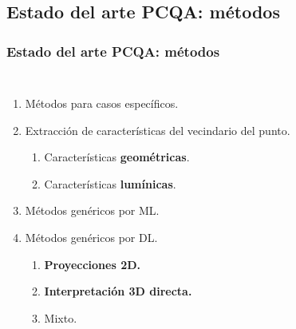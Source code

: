 \subsection{Estado del arte PCQA: métodos}
\begin{frame}
  \frametitle{Estado del arte PCQA: métodos}
  \begin{columns}
    \begin{enumerate}
      \item Métodos para casos específicos. 
      \item Extracción de características del vecindario del punto.
        \begin{enumerate}
          \item Características \textbf{geométricas}.
          \item Características \textbf{lumínicas}.
        \end{enumerate}
      \item Métodos genéricos por ML. 
      \item Métodos genéricos por DL.
        \begin{enumerate}
          \item \textbf{Proyecciones 2D.}
          \item \textbf{Interpretación 3D directa.}
          \item Mixto.
        \end{enumerate}
    \end{enumerate}


\end{columns}
\end{frame}
